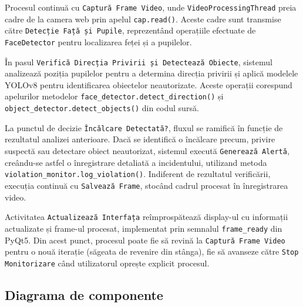 \documentclass[12pt,a4paper]{article}
\begin{document}
Procesul continuă cu \texttt{Captură Frame Video}, unde \texttt{VideoProcessingThread} preia cadre de la camera web prin apelul \texttt{cap.read()}. Aceste cadre sunt transmise către \texttt{Detecție Față și Pupile}, reprezentând operațiile efectuate de \texttt{FaceDetector} pentru localizarea feței și a pupilelor. 

În pasul \texttt{Verifică Direcția Privirii și Detectează Obiecte}, sistemul analizează poziția pupilelor pentru a determina direcția privirii și aplică modelele YOLOv8 pentru identificarea obiectelor neautorizate. Aceste operații corespund apelurilor metodelor \texttt{face\_detector.detect\_direction()} și \texttt{object\_detector.detect\_objects()} din codul sursă.

La punctul de decizie \texttt{Încălcare Detectată?}, fluxul se ramifică în funcție de rezultatul analizei anterioare. Dacă se identifică o încălcare precum, privire suspectă sau detectare obiect neautorizat, sistemul execută \texttt{Generează Alertă}, creându-se astfel o înregistrare detaliată a incidentului, utilizand metoda \texttt{violation\_monitor.log\_violation()}. Indiferent de rezultatul verificării, execuția continuă cu \texttt{Salvează Frame}, stocând cadrul procesat în înregistrarea video.

Activitatea \texttt{Actualizează Interfața} reîmprospătează display-ul cu informații actualizate și frame-ul procesat, implementat prin semnalul \texttt{frame\_ready} din PyQt5. Din acest punct, procesul poate fie să revină la \texttt{Captură Frame Video} pentru o nouă iterație (săgeata de revenire din stânga), fie să avanseze către \texttt{Stop Monitorizare} când utilizatorul oprește explicit procesul.

\subsection{Diagrama de componente}
\end{document}

